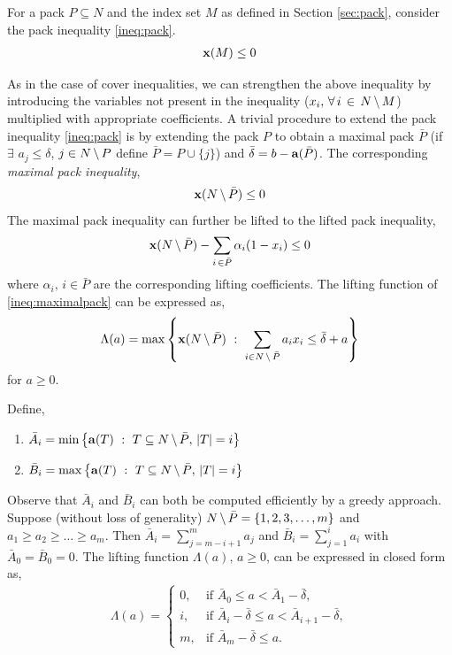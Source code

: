 \documentclass[10pt,twoside]{amsart}
\begin{document}
For a pack $P \subseteq N$ and the index set $M$ as defined in Section \ref{sec:pack}, consider the pack inequality \eqref{ineq:pack}.
\begin{align*}
        \mathbf{x}(M) \leq 0
\end{align*}

As in the case of cover inequalities, we can strengthen the above inequality by introducing the variables not present in the inequality ($x_i,\,\forall\, i \,\in\, N\,\backslash\, M$) multiplied with appropriate coefficients. A trivial procedure to extend the pack inequality \eqref{ineq:pack} is by extending the pack $P$ to obtain a maximal pack $\bar{P}$ (if $\exists$ $a_j \leq \delta$, $j \in N\,\backslash\, P$ define $\bar{P} = P\cup \{j\}$) and $\bar{\delta} = b - \mathbf{a}(\bar{P})$. The corresponding \textit{maximal pack inequality},
\begin{align}
        \mathbf{x}(N\,\backslash\, \bar{P}) \leq 0 \label{ineq:maximalpack}
\end{align}
The maximal pack inequality can further be lifted to the lifted pack inequality,
\begin{align*}
        \mathbf{x}(N\,\backslash\, \bar{P}) - \sum_{i\,\in \bar{P}} \alpha_i (1-x_i) \leq 0 \label{ineq:liftedpack}
\end{align*}
where $\alpha_i,\,i\in \bar{P}$ are the corresponding lifting coefficients. The lifting function of \eqref{ineq:maximalpack} can be expressed as,
\begin{align}
  \Lambda(a) = \max\left\{ {\mathbf{x}(N\,\backslash\, \bar{P})} \ : \ {\sum_{i\in N\,\backslash\, \bar{P}} a_ix_i \leq \bar{\delta} + a} \right\}
\end{align}
for $a\geq 0$.

Define,
\begin{enumerate}[label=(\roman{*})]
  \item $\bar{A}_i = \min\left\{ {\mathbf{a}(T)} \ : \ {T\subseteq N\,\backslash\, \bar{P},\,|T| = i} \right\}$\\[-2mm]
  \item $\bar{B}_i = \max\left\{ {\mathbf{a}(T)} \ : \ {T\subseteq N\,\backslash\, \bar{P},\,|T| = i} \right\}$
\end{enumerate}

Observe that $\bar{A}_i$ and $\bar{B}_i$ can both be computed efficiently by a greedy approach. Suppose (without loss of generality) $N\,\backslash\, \bar{P} = \{1,2,3,\ldots, m\}$ and $a_1 \geq a_2 \geq \ldots \geq a_m$. Then $\bar{A}_i = \sum_{j= m-i+1}^m a_j$ and $\bar{B}_i = \sum_{j=1}^i a_i$ with $\bar{A}_0 = \bar{B}_0 = 0$. The lifting function $\Lambda(a),\, a\geq 0$, can be expressed in closed form as,
\begin{align}
  \Lambda(a) =  \begin{cases}
                   0, & \mbox{if } \bar{A}_{0} \leq a < \bar{A}_1 - \bar{\delta},\\
                   i, &  \mbox{if } \bar{A}_{i} - \bar{\delta} \leq a < \bar{A}_{i+1} - \bar{\delta},\\
                   m, &  \mbox{if } \bar{A}_{m} - \bar{\delta} \leq a.
                \end{cases}
\end{align}
\end{document}
